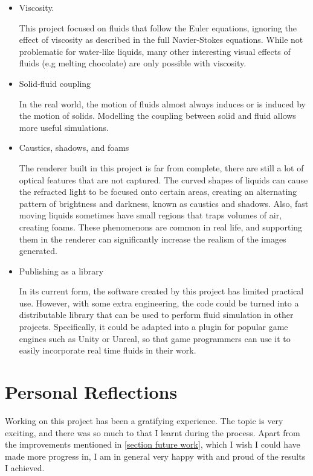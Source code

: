 \begin{itemize}
    \item Viscosity.
    
    This project focused on fluids that follow the Euler equations, ignoring the effect of viscosity as described in the full Navier-Stokes equations. While not problematic for water-like liquids, many other interesting visual effects of fluids (e.g melting chocolate) are only possible with viscosity. 
    

    \item Solid-fluid coupling
    
    In the real world, the motion of fluids almost always induces or is induced by the motion of solids. Modelling the coupling between solid and fluid allows more useful simulations. 

    \item Caustics, shadows, and foams
    
    The renderer built in this project is far from complete, there are still a lot of optical features that are not captured. The curved shapes of liquids can cause the refracted light to be focused onto certain areas, creating an alternating pattern of brightness and darkness, known as caustics and shadows. Also, fast moving liquids sometimes have small regions that traps volumes of air, creating foams. These phenomenons are common in real life, and supporting them in the renderer can significantly increase the realism of the images generated.


    \item Publishing as a library
    
    In its current form, the software created by this project has limited practical use. However, with some extra engineering, the code could be turned into a distributable library that can be used to perform fluid simulation in other projects. Specifically, it could be adapted into a plugin for popular game engines such as Unity or Unreal, so that game programmers can use it to easily incorporate real time fluids in their work. 
    
\end{itemize}

\section{Personal Reflections}
Working on this project has been a gratifying experience. The topic is very exciting, and there was so much to that I learnt during the process. Apart from the improvements mentioned in \ref{section future work}, which I wish I could have made more progress in, I am in general very happy with and proud of the results I achieved.

